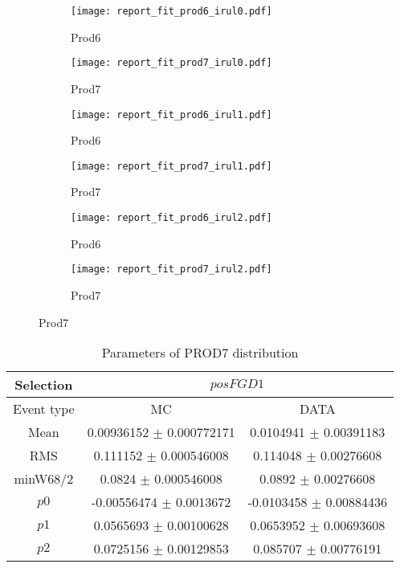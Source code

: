 \documentclass[a4paper,12pt]{article}
\begin{document}
\begin{figure}[htbp]
	\begin{subfigure}[]{0.5\textwidth}
		\centering
		\texttt{[image: report\_fit\_prod6\_irul0.pdf]} 
	    \caption{Prod6}
	\end{subfigure}%
	\hfill
	\begin{subfigure}[]{0.5\textwidth}
		\centering
		\texttt{[image: report\_fit\_prod7\_irul0.pdf]} 
	    \caption{Prod7}
	\end{subfigure}%

	\begin{subfigure}[]{0.5\textwidth}
		\centering
		\texttt{[image: report\_fit\_prod6\_irul1.pdf]} 
	    \caption{Prod6}
	\end{subfigure}%
	\hfill
	\begin{subfigure}[]{0.5\textwidth}
		\centering
		\texttt{[image: report\_fit\_prod7\_irul1.pdf]} 
	    \caption{Prod7}
	\end{subfigure}%
	
	\begin{subfigure}[]{0.5\textwidth}
		\centering
		\texttt{[image: report\_fit\_prod6\_irul2.pdf]} 
	    \caption{Prod6}
	\end{subfigure}%
	\hfill
	\begin{subfigure}[]{0.5\textwidth}
		\centering
		\texttt{[image: report\_fit\_prod7\_irul2.pdf]} 
	    \caption{Prod7}
	\end{subfigure}%
\end{figure}




\begin{table}[p]
\begin{center}
\begin{tabular}{|c|c|c|}
        \hline
        Selection & \multicolumn{2}{|c|}{$posFGD1$}  \\ \hline
        Event type & MC & DATA \\ 
        \hline
        Mean & 0.00936152 $\pm$ 0.000772171 & 0.0104941 $\pm$ 0.00391183 \\ 
        \hline 
        RMS & 0.111152 $\pm$ 0.000546008 & 0.114048 $\pm$ 0.00276608 \\ 
        \hline 
        minW68/2 & 0.0824 $\pm$ 0.000546008 & 0.0892 $\pm$ 0.00276608 \\ 
        \hline 
        $p0$ & -0.00556474 $\pm$ 0.0013672 & -0.0103458 $\pm$ 0.00884436 \\ 
        \hline 
        $p1$ & 0.0565693 $\pm$ 0.00100628 & 0.0653952 $\pm$ 0.00693608 \\ 
        \hline 
        $p2$ & 0.0725156 $\pm$ 0.00129853 & 0.085707 $\pm$ 0.00776191 \\ 
        \hline 
\end{tabular}
\caption{Parameters of PROD7 distribution } \vspace{0.2in}
\label{xxx}
\end{center}
\end{table}
\end{document}
